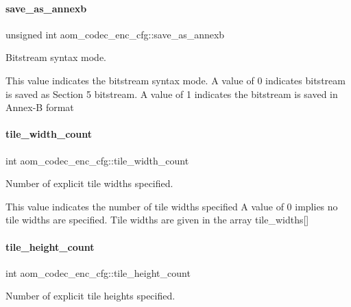 \paragraph{\texorpdfstring{save\+\_\+as\+\_\+annexb}{save\_as\_annexb}}
{\footnotesize\ttfamily unsigned int aom\+\_\+codec\+\_\+enc\+\_\+cfg\+::save\+\_\+as\+\_\+annexb}



Bitstream syntax mode. 

This value indicates the bitstream syntax mode. A value of 0 indicates bitstream is saved as Section 5 bitstream. A value of 1 indicates the bitstream is saved in Annex-\/B format \mbox{\label{structaom__codec__enc__cfg_a1b1fc8284e9a26deb875b1b2a58e47d9}} 
\paragraph{\texorpdfstring{tile\+\_\+width\+\_\+count}{tile\_width\_count}}
{\footnotesize\ttfamily int aom\+\_\+codec\+\_\+enc\+\_\+cfg\+::tile\+\_\+width\+\_\+count}



Number of explicit tile widths specified. 

This value indicates the number of tile widths specified A value of 0 implies no tile widths are specified. Tile widths are given in the array tile\+\_\+widths\mbox{[}\mbox{]} \mbox{\label{structaom__codec__enc__cfg_aefb0569c7e68dd865067417145d39a0c}} 
\paragraph{\texorpdfstring{tile\+\_\+height\+\_\+count}{tile\_height\_count}}
{\footnotesize\ttfamily int aom\+\_\+codec\+\_\+enc\+\_\+cfg\+::tile\+\_\+height\+\_\+count}



Number of explicit tile heights specified. 

